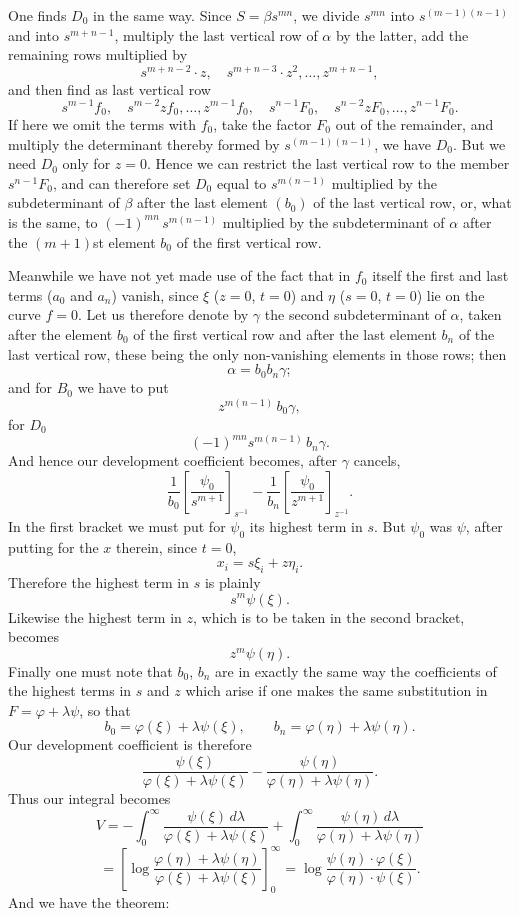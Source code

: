 \documentclass[10pt]{article}
\begin{document}
One finds $D_0$ in the same way. Since $S=\beta s^{mn}$, we divide $s^{mn}$ into $s^{(m-1)(n-1)}$ and into $s^{m+n-1}$, multiply the last vertical row of $\alpha$ by the latter, add the remaining rows multiplied by
\[
s^{m+n-2}\cdot z,
\quad s^{m+n-3}\cdot z^2,
\ldots,
 z^{m+n-1},
\]
and then find as last vertical row
\[
s^{m-1}f_0,
\quad s^{m-2}zf_0,\ldots,z^{m-1}f_0,
\quad s^{n-1}F_0,
\quad s^{n-2}zF_0,\ldots,z^{n-1}F_0.
\]
If here we omit the terms with $f_0$, take the factor $F_0$ out of the remainder, and multiply the determinant thereby formed by $s^{(m-1)(n-1)}$, we have $D_0$. But we need $D_0$ only for $z=0$. Hence we can restrict the last vertical row to the member $s^{n-1}F_0$, and can therefore set $D_0$ equal to $s^{m(n-1)}$ multiplied by the subdeterminant of $\beta$ after the last element $(b_0)$ of the last vertical row, or, what is the same, to $(-1)^{mn}\,s^{m(n-1)}$ multiplied by the subdeterminant of $\alpha$ after the $(m+1)$st element $b_0$ of the first vertical row.

Meanwhile we have not yet made use of the fact that in $f_0$ itself the first and last terms ($a_0$ and $a_n$) vanish, since $\xi$ ($z=0$, $t=0$) and $\eta$ ($s=0$, $t=0$) lie on the curve $f=0$. Let us therefore denote by $\gamma$ the second subdeterminant of $\alpha$, taken after the element $b_0$ of the first vertical row and after the last element $b_n$ of the last vertical row, these being the only non-vanishing elements in those rows; then
\[
\alpha=b_0b_n\gamma;
\]
and for $B_0$ we have to put
\[
z^{m(n-1)}\,b_0\gamma,
\]
for $D_0$
\[
(-1)^{mn}s^{m(n-1)}\,b_n\gamma.
\]
And hence our development coefficient becomes, after $\gamma$ cancels,
\[
\frac{1}{b_0}\left[\frac{\psi_0}{s^{m+1}}\right]_{s^{-1}}
-\frac{1}{b_n}\left[\frac{\psi_0}{z^{m+1}}\right]_{z^{-1}}.
\]
In the first bracket we must put for $\psi_0$ its highest term in $s$. But $\psi_0$ was $\psi$, after putting for the $x$ therein, since $t=0$,
\[
x_i=s\xi_i+z\eta_i.
\]
Therefore the highest term in $s$ is plainly
\[
s^m\psi(\xi).
\]
Likewise the highest term in $z$, which is to be taken in the second bracket, becomes
\[
z^m\psi(\eta).
\]
Finally one must note that $b_0$, $b_n$ are in exactly the same way the coefficients of the highest terms in $s$ and $z$ which arise if one makes the same substitution in $F=\varphi+\lambda\psi$, so that
\[
b_0=\varphi(\xi)+\lambda\psi(\xi),
\qquad
b_n=\varphi(\eta)+\lambda\psi(\eta).
\]
Our development coefficient is therefore
\[
\frac{\psi(\xi)}{\varphi(\xi)+\lambda\psi(\xi)}
-\frac{\psi(\eta)}{\varphi(\eta)+\lambda\psi(\eta)}.
\]
Thus our integral becomes
\[
V=-\int_0^\infty \frac{\psi(\xi)\,d\lambda}{\varphi(\xi)+\lambda\psi(\xi)}
+\int_0^\infty \frac{\psi(\eta)\,d\lambda}{\varphi(\eta)+\lambda\psi(\eta)}
\]
\[
=\left[\log\frac{\varphi(\eta)+\lambda\psi(\eta)}{\varphi(\xi)+\lambda\psi(\xi)}\right]_0^\infty
=\log\frac{\psi(\eta)\cdot\varphi(\xi)}{\varphi(\eta)\cdot\psi(\xi)}.
\]
And we have the theorem:
\end{document}
